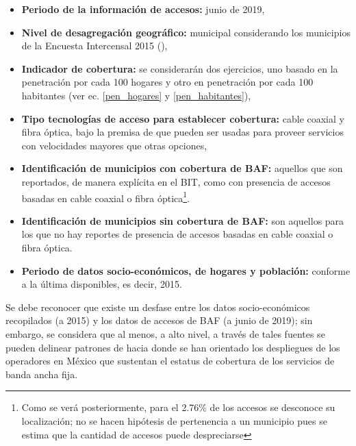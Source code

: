 \documentclass[9pt,twocolumn,twoside]{ilcss}
\begin{document}
\begin{itemize}
	\item \textbf{Periodo de la información de accesos:} junio de 2019,\vspace{-0.2cm}
	\item \textbf{Nivel de desagregación geográfico:} municipal considerando los municipios de la Encuesta Intercensal 2015 (\cite{Intercensal2015}),\vspace{-0.2cm}
	\item \textbf{Indicador de cobertura:} se considerarán dos ejercicios, uno basado en la penetración por cada 100 hogares y otro en penetración por cada 100 habitantes (ver ec. \ref{pen_hogares} y \ref{pen_habitantes}),\vspace{-0.2cm} 
	\item \textbf{Tipo tecnologías de acceso para establecer cobertura:} cable coaxial y fibra óptica, bajo la premisa de que
	pueden ser usadas para proveer servicios con velocidades mayores que otras opciones,\vspace{-0.2cm}
	\item \textbf{Identificación de municipios con cobertura de BAF:} aquellos que son reportados, de manera explícita en el BIT, como con presencia de accesos basadas en cable coaxial o fibra óptica\footnote{Como se verá posteriormente, para el 2.76\% de los accesos se desconoce su localización; no se hacen hipótesis de pertenencia a un municipio pues se estima que la cantidad de accesos puede despreciarse}.\vspace{-0.2cm}
	\item \textbf{Identificación de municipios sin cobertura de BAF:} son aquellos para los que no hay reportes de presencia de accesos basadas en cable coaxial o fibra óptica.\vspace{-0.2cm}
	\item \textbf{Periodo de datos socio-económicos, de hogares y población:} conforme a la última disponibles, es decir, 2015.\vspace{-0.1cm}
\end{itemize}

Se debe reconocer que existe un desfase entre los datos socio-económicos recopilados (a 2015) y los datos de accesos de BAF (a junio de 2019); sin embargo, se considera que al menos, a alto nivel, a través de tales fuentes se pueden delinear patrones de hacia donde se han orientado los despliegues de los operadores en México que sustentan el estatus de cobertura de los servicios de banda ancha fija. 
\end{document}
